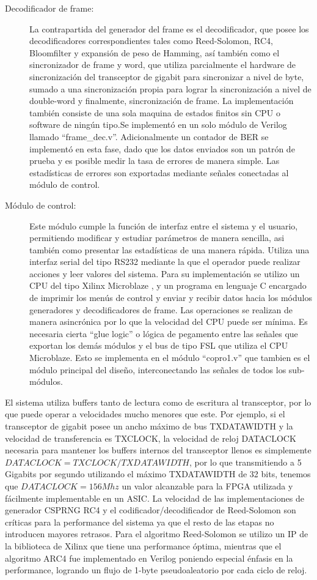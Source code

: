 \begin{description}
 \item[Decodificador de frame:] La contrapartida del generador del frame es el decodificador, que posee los decodificadores correspondientes tales como Reed-Solomon, RC4, Bloomfilter y expansión de peso de Hamming, así también como el sincronizador de frame y word, que utiliza parcialmente el hardware de sincronización del transceptor de gigabit para sincronizar a nivel de byte, sumado a una sincronización propia para lograr la sincronización a nivel de double-word y finalmente, sincronización de frame. La implementación también consiste de una sola maquina de estados finitos sin CPU o software de ningún tipo.Se implementó en un solo módulo de Verilog llamado ``frame\_dec.v''. Adicionalmente un contador de BER se implementó en esta fase, dado que los datos enviados son un patrón de prueba y es posible medir la tasa de errores de manera simple. Las estadísticas de errores son exportadas mediante señales conectadas al módulo de control.
 
 \item[Módulo de control:] Este módulo cumple la función de interfaz entre el sistema y el usuario, permitiendo modificar y estudiar parámetros de manera sencilla, asi también como presentar las estadísticas de una manera rápida. Utiliza una interfaz serial del tipo RS232 mediante la que el operador puede realizar acciones y leer valores del sistema. Para su implementación se utilizo un CPU del tipo Xilinx Microblaze \cite{Xilinx:DS865}, y un programa en lenguaje C encargado de imprimir los menús de control y enviar y recibir datos hacia los módulos generadores y decodificadores de frame. Las operaciones se realizan de manera asincrónica por lo que la velocidad del CPU puede ser mínima. Es necesaria cierta ``glue logic'' o lógica de pegamento entre las señales que exportan los demás módulos y el bus de tipo FSL que utiliza el CPU Microblaze. Esto se implementa en el módulo ``copro1.v'' que tambien es el módulo principal del diseño, interconectando las señales de todos los sub-módulos.
\end{description}

El sistema utiliza buffers tanto de lectura como de escritura al transceptor, por lo que puede operar a velocidades mucho menores que este. Por ejemplo, si el transceptor de gigabit posee un ancho máximo de bus TXDATAWIDTH y la velocidad de transferencia es TXCLOCK, la velocidad de reloj DATACLOCK necesaria para mantener los buffers internos del transceptor llenos es simplemente $DATACLOCK=TXCLOCK/TXDATAWIDTH$, por lo que transmitiendo a 5 Gigabits por segundo utilizando el máximo TXDATAWIDTH de 32 bits, tenemos que $DATACLOCK=156Mhz$ un valor alcanzable para la FPGA utilizada y fácilmente implementable en un ASIC.
La velocidad de las implementaciones de generador CSPRNG RC4 y el codificador/decodificador de Reed-Solomon son críticas para la performance del sistema ya que el resto de las etapas no introducen mayores retrasos. Para el algoritmo Reed-Solomon se utilizo un IP de la biblioteca de Xilinx que tiene una performance óptima, mientras que el algoritmo ARC4 fue implementado en Verilog poniendo especial énfasis en la performance, logrando un flujo de 1-byte pseudoaleatorio por cada ciclo de reloj.

